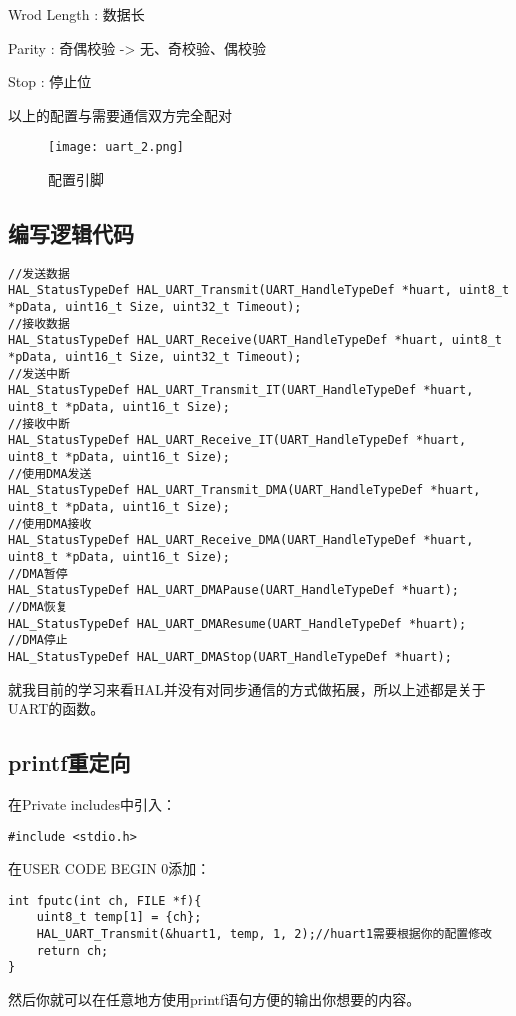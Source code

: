 \documentclass[cn,11pt]{elegantbook}
\begin{document}
Wrod Length : 数据长

Parity : 奇偶校验 -> 无、奇校验、偶校验

Stop : 停止位

以上的配置与需要通信双方完全配对

\begin{figure}[htbp]
	\centering
	\texttt{[image: uart\_2.png]}
	\caption{配置引脚\label{fig:scatter}}
\end{figure}

\newpage

\subsection{编写逻辑代码}

\lstset{  language=C}
\begin{lstlisting}
//发送数据
HAL_StatusTypeDef HAL_UART_Transmit(UART_HandleTypeDef *huart, uint8_t *pData, uint16_t Size, uint32_t Timeout);
//接收数据
HAL_StatusTypeDef HAL_UART_Receive(UART_HandleTypeDef *huart, uint8_t *pData, uint16_t Size, uint32_t Timeout);
//发送中断
HAL_StatusTypeDef HAL_UART_Transmit_IT(UART_HandleTypeDef *huart, uint8_t *pData, uint16_t Size);
//接收中断
HAL_StatusTypeDef HAL_UART_Receive_IT(UART_HandleTypeDef *huart, uint8_t *pData, uint16_t Size);
//使用DMA发送
HAL_StatusTypeDef HAL_UART_Transmit_DMA(UART_HandleTypeDef *huart, uint8_t *pData, uint16_t Size);
//使用DMA接收
HAL_StatusTypeDef HAL_UART_Receive_DMA(UART_HandleTypeDef *huart, uint8_t *pData, uint16_t Size);
//DMA暂停
HAL_StatusTypeDef HAL_UART_DMAPause(UART_HandleTypeDef *huart);
//DMA恢复
HAL_StatusTypeDef HAL_UART_DMAResume(UART_HandleTypeDef *huart);
//DMA停止
HAL_StatusTypeDef HAL_UART_DMAStop(UART_HandleTypeDef *huart);
\end{lstlisting}
就我目前的学习来看HAL并没有对同步通信的方式做拓展，所以上述都是关于UART的函数。

\subsection{printf重定向}
在Private includes中引入：
\begin{lstlisting}
#include <stdio.h>
\end{lstlisting}

在USER CODE BEGIN 0添加：
\lstset{  language=C}
\begin{lstlisting}
int fputc(int ch, FILE *f){
	uint8_t temp[1] = {ch};
	HAL_UART_Transmit(&huart1, temp, 1, 2);//huart1需要根据你的配置修改
	return ch;
}

\end{lstlisting}
然后你就可以在任意地方使用printf语句方便的输出你想要的内容。
\end{document}
